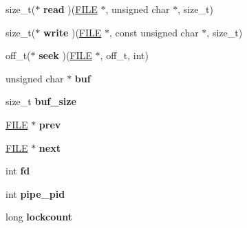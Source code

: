 \begin{DoxyCompactItemize}
\mbox{\label{struct___i_o___f_i_l_e_a1a5d053b1cd0ceea98436ec41ea123a6}} 
size\+\_\+t($\ast$ {\bfseries read} )(\mbox{\hyperlink{struct___i_o___f_i_l_e}{F\+I\+LE}} $\ast$, unsigned char $\ast$, size\+\_\+t)
\item 
\mbox{\label{struct___i_o___f_i_l_e_a9cff8405e58a3ea9ce8ce80b06f71c7d}} 
size\+\_\+t($\ast$ {\bfseries write} )(\mbox{\hyperlink{struct___i_o___f_i_l_e}{F\+I\+LE}} $\ast$, const unsigned char $\ast$, size\+\_\+t)
\item 
\mbox{\label{struct___i_o___f_i_l_e_a5861db6ddc27fb293532d15a4da9c817}} 
off\+\_\+t($\ast$ {\bfseries seek} )(\mbox{\hyperlink{struct___i_o___f_i_l_e}{F\+I\+LE}} $\ast$, off\+\_\+t, int)
\item 
\mbox{\label{struct___i_o___f_i_l_e_acd0cb2f72b7bc810c41790fa7335b75c}} 
unsigned char $\ast$ {\bfseries buf}
\item 
\mbox{\label{struct___i_o___f_i_l_e_a09811aef7134756be00d891fa8b460d2}} 
size\+\_\+t {\bfseries buf\+\_\+size}
\item 
\mbox{\label{struct___i_o___f_i_l_e_af9ca40a36949ede75150bda6f492d0e6}} 
\mbox{\hyperlink{struct___i_o___f_i_l_e}{F\+I\+LE}} $\ast$ {\bfseries prev}
\item 
\mbox{\label{struct___i_o___f_i_l_e_aa4aa846651879880fe2e44a70ff62ac2}} 
\mbox{\hyperlink{struct___i_o___f_i_l_e}{F\+I\+LE}} $\ast$ {\bfseries next}
\item 
\mbox{\label{struct___i_o___f_i_l_e_a55b42e51140aae37fac00fa45a1a7b84}} 
int {\bfseries fd}
\item 
\mbox{\label{struct___i_o___f_i_l_e_a34fc9d43676c315973a794c725902eff}} 
int {\bfseries pipe\+\_\+pid}
\item 
\mbox{\label{struct___i_o___f_i_l_e_a56b1aa1009ee90d0033fea2a738c76e3}} 
long {\bfseries lockcount}
\item 
\mbox{\label{struct___i_o___f_i_l_e_ae150f3363a6ae031e17b70bdd90f5f75}} 

\end{DoxyCompactItemize}
